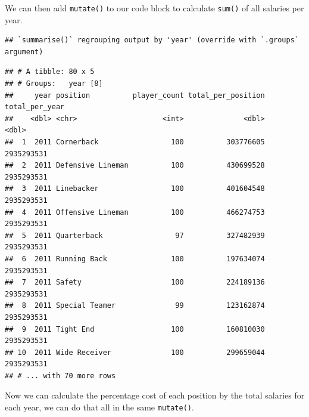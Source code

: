 \documentclass[
]{book}
\newenvironment{Shaded}{\begin{snugshade}}{\end{snugshade}}
\newcommand{\DataTypeTok}[1]{\textcolor[rgb]{0.13,0.29,0.53}{#1}}
\newcommand{\KeywordTok}[1]{\textcolor[rgb]{0.13,0.29,0.53}{\textbf{#1}}}
\newcommand{\NormalTok}[1]{#1}
\newcommand{\OperatorTok}[1]{\textcolor[rgb]{0.81,0.36,0.00}{\textbf{#1}}}
\newcommand{\StringTok}[1]{\textcolor[rgb]{0.31,0.60,0.02}{#1}}
\begin{document}
We can then add \texttt{mutate()} to our code block to calculate \texttt{sum()} of all salaries per year.

\begin{Shaded}
\end{Shaded}

\begin{verbatim}
## `summarise()` regrouping output by 'year' (override with `.groups` argument)
\end{verbatim}

\begin{verbatim}
## # A tibble: 80 x 5
## # Groups:   year [8]
##     year position          player_count total_per_position total_per_year
##    <dbl> <chr>                    <int>              <dbl>          <dbl>
##  1  2011 Cornerback                 100          303776605     2935293531
##  2  2011 Defensive Lineman          100          430699528     2935293531
##  3  2011 Linebacker                 100          401604548     2935293531
##  4  2011 Offensive Lineman          100          466274753     2935293531
##  5  2011 Quarterback                 97          327482939     2935293531
##  6  2011 Running Back               100          197634074     2935293531
##  7  2011 Safety                     100          224189136     2935293531
##  8  2011 Special Teamer              99          123162874     2935293531
##  9  2011 Tight End                  100          160810030     2935293531
## 10  2011 Wide Receiver              100          299659044     2935293531
## # ... with 70 more rows
\end{verbatim}

Now we can calculate the percentage cost of each position by the total salaries for each year, we can do that all in the same \texttt{mutate()}.

\begin{Shaded}
\end{Shaded}
\end{document}
